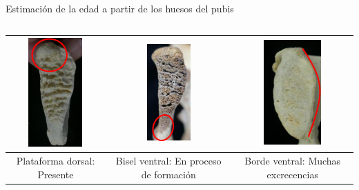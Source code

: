 \documentclass{beamer}
\begin{document}
\begin{frame}{Estimación de la edad a partir de los huesos del pubis}
\begin{columns}[T]
\begin{column}{.7\textwidth}
\begin{table}[H]
{\begin{tabular}{|c|c|c|}
					\includegraphics[scale = 0.75]{huesos/nodulo_oseo_presente.png} & \includegraphics[scale = 0.75]{huesos/borde_inferior_no_definido.png} &  \includegraphics[scale = 0.75]{huesos/borde_dorsal_definido.png} \\ \hline
					Plataforma dorsal: Presente & Bisel ventral: En proceso de formación & Borde ventral: Muchas excrecencias \\ \hline

\end{tabular}}
\end{table}
\end{column}
\end{columns}
\end{frame}
\end{document}
